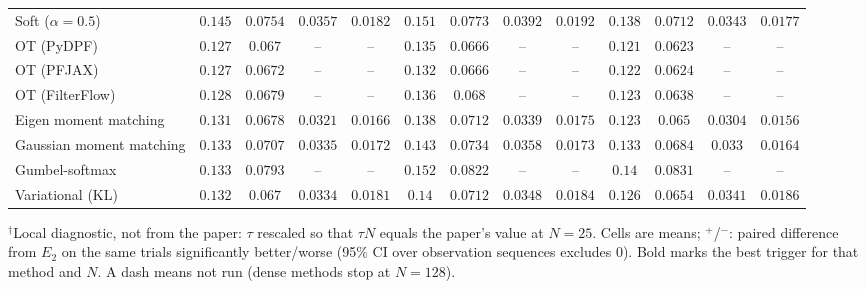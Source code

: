 \begin{table}[ht]
\begin{adjustbox}{max width=\linewidth}
\begin{tabular}{lcccc|cccc|cccc}
Soft ($\alpha{=}0.5$) & $0.145$ & $0.0754$ & $0.0357$ & $0.0182$ & $0.151$ & $0.0773$ & $0.0392$ & $0.0192$ & $\mathbf{0.138}$ & $\mathbf{0.0712}$ & $\mathbf{0.0343}$ & $\mathbf{0.0177}$ \\
OT (PyDPF) & $0.127$ & $0.067$ & -- & -- & $0.135$ & $0.0666$ & -- & -- & $\mathbf{0.121}$ & $\mathbf{0.0623}$ & -- & -- \\
OT (PFJAX) & $0.127$ & $0.0672$ & -- & -- & $0.132$ & $0.0666$ & -- & -- & $\mathbf{0.122}$ & $\mathbf{0.0624}$ & -- & -- \\
OT (FilterFlow) & $0.128$ & $0.0679$ & -- & -- & $0.136$ & $0.068$ & -- & -- & $\mathbf{0.123}$ & $\mathbf{0.0638}$ & -- & -- \\
Eigen moment matching & $0.131$ & $0.0678$ & $0.0321$ & $0.0166$ & $0.138$ & $0.0712$ & $0.0339$ & $0.0175$ & $\mathbf{0.123}$ & $\mathbf{0.065}$ & $\mathbf{0.0304}$ & $\mathbf{0.0156}$ \\
Gaussian moment matching & $0.133$ & $0.0707$ & $0.0335$ & $0.0172$ & $0.143$ & $0.0734$ & $0.0358$ & $0.0173$ & $\mathbf{0.133}$ & $\mathbf{0.0684}$ & $\mathbf{0.033}$ & $\mathbf{0.0164}$ \\
Gumbel-softmax & $\mathbf{0.133}$ & $\mathbf{0.0793}$ & -- & -- & $0.152$ & $0.0822$ & -- & -- & $0.14$ & $0.0831$ & -- & -- \\
Variational (KL) & $0.132$ & $0.067$ & $\mathbf{0.0334}$ & $\mathbf{0.0181}$ & $0.14$ & $0.0712$ & $0.0348$ & $0.0184$ & $\mathbf{0.126}$ & $\mathbf{0.0654}$ & $0.0341$ & $0.0186$ \\
\bottomrule
\end{tabular}
\end{adjustbox}
\par\smallskip\parbox{0.95\linewidth}{\footnotesize $^\dagger$Local diagnostic, not from the paper: $\tau$ rescaled so that $\tau N$ equals the paper's value at $N{=}25$. Cells are means; $^{+}$/$^{-}$: paired difference from $E_2$ on the same trials significantly better/worse (95\% CI over observation sequences excludes 0). Bold marks the best trigger for that method and $N$. A dash means not run (dense methods stop at $N{=}128$).}
\end{table}

